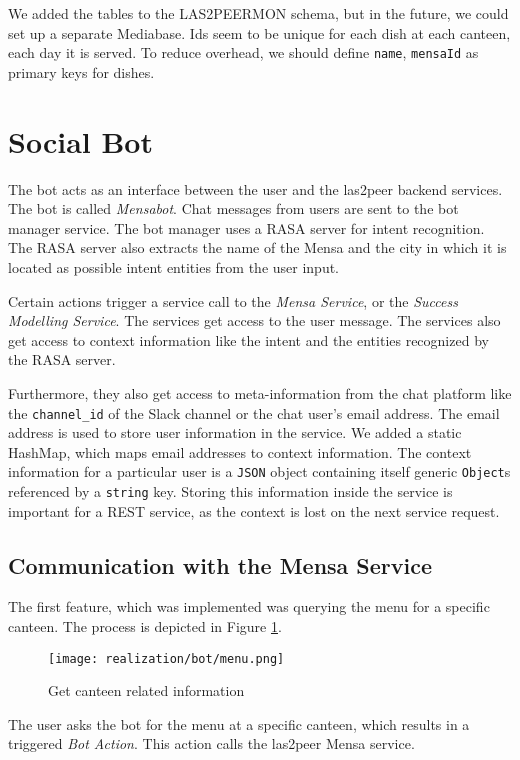 We added the tables to the LAS2PEERMON schema, but in the future, we could set up a separate Mediabase.
Ids seem to be unique for each dish at each canteen, each day it is served. To reduce overhead, we should define \texttt{name}, \texttt{mensaId} as primary keys for dishes.


\section{Social Bot}
The bot acts as an interface between the user and the las2peer backend services. The bot is called \emph{Mensabot}.
Chat messages from users are sent to the bot manager service. 
The bot manager uses a RASA server for intent recognition. 
The RASA server also extracts the name of the Mensa and the city in which it is located as possible intent entities from the user input.

Certain actions trigger a service call to the \emph{Mensa Service}, or the \emph{Success Modelling Service}.
The services get access to the user message.  
The services also get access to context information like the intent and the entities recognized by the RASA server.

Furthermore, they also get access to meta-information from the chat platform like the \texttt{channel\_id} of the Slack channel or the chat user's email address. 
The email address is used to store user information in the service. We added a static HashMap, which maps email addresses to context information. The context information for a particular user is a \texttt{JSON} object containing itself generic \texttt{Object}s referenced by a \texttt{string} key. 
Storing this information inside the service is important for a REST service, as the context is lost on the next service request.

\subsection{Communication with the Mensa Service}
The first feature, which was implemented was querying the menu for a specific canteen. 
The process is depicted in Figure \ref{fig:getMenu}.
\begin{figure}[h]
    \centering
    \texttt{[image: realization/bot/menu.png]}
    \caption{Get canteen related information}
    \label{fig:getMenu}
\end{figure}
The user asks the bot for the menu at a specific canteen, which results in a triggered \emph{Bot Action}. This action calls the las2peer Mensa service. 

